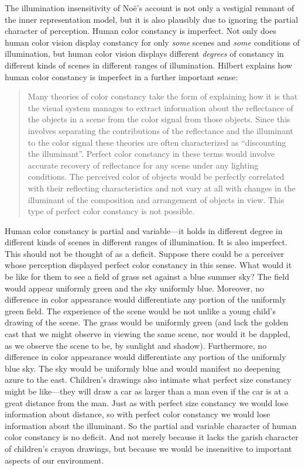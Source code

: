 \documentclass[12pt]{article}
\begin{document}
The illumination insensitivity of Noë's account is not only a vestigial remnant of the inner representation model, but it is also plausibly due to ignoring the partial character of perception. Human color constancy is imperfect. Not only does human color vision display constancy for only \emph{some} scenes and \emph{some} conditions of illumination, but human color vision displays different \emph{degrees} of constancy in different kinds of scenes in different ranges of illumination. Hilbert explains how human color constancy is imperfect in a further important sense:
	\begin{quote}
		Many theories of color constancy take the form of explaining how it is that the visual system manages to extract information about the reflectance of the objects in a scene from the color signal from those objects. Since this involves separating the contributions of the reflectance and the illuminant to the color signal these theories are often characterized as ``discounting the illuminant''. Perfect color constancy in these terms would involve accurate recovery of reflectance for any scene under any lighting conditions. The perceived color of objects would be perfectly correlated with their reflecting characteristics and not vary at all with changes in the illuminant of the composition and arrangement of objects in view. This type of perfect color constancy is not possible. \citep[143]{Hilbert:2007qy}
	\end{quote}

Human color constancy is partial and variable---it holds in different degree in different kinds of scenes in different ranges of illumination. It is also imperfect. This should not be thought of as a deficit. Suppose there could be a perceiver whose perception displayed perfect color constancy in this sense. What would it be like for them to see a field of grass set against a blue summer sky? The field would appear uniformly green and the sky uniformly blue. Moreover, no difference in color appearance would differentiate any portion of the uniformly green field. The experience of the scene would be not unlike a young child's drawing of the scene. The grass would be uniformly green (and lack the golden cast that we might observe in viewing the same scene, nor would it be dappled, as we observe the scene to be, by sunlight and shadow). Furthermore, no difference in color appearance would differentiate any portion of the uniformly blue sky. The sky would be uniformly blue and would manifest no deepening azure to the east. Children's drawings also intimate what perfect size constancy might be like---they will draw a car as larger than a man even if the car is at a great distance from the man. Just as with perfect size constancy we would lose information about distance, so with perfect color constancy we would lose information about the illuminant. So the partial and variable character of human color constancy is no deficit. And not merely because it lacks the garish character of children's crayon drawings, but because we would be insensitive to important aspects of our environment.



 
 
\end{document}
